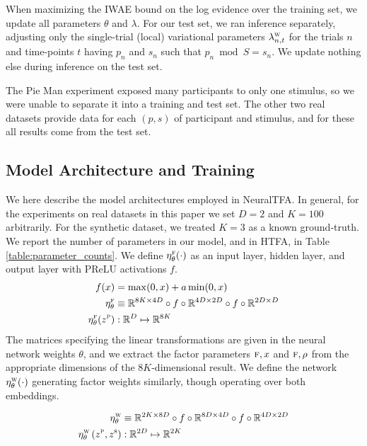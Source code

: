 \documentclass[twoside]{article}
\newcommand{\scf}{\textsc{f}}
\newcommand{\scw}{\textsc{w}}
\newcommand{\scp}{\textsc{p}}
\newcommand{\scs}{\textsc{s}}
\begin{document}
When maximizing the IWAE bound on the log evidence over the training set, we update all parameters $\theta$ and $\lambda$.  For our test set, we ran inference separately, adjusting only the single-trial (local) variational parameters $\lambda^\scw_{n,t}$ for the trials $n$ and time-points $t$ having $p_n$ and $s_n$ such that $p_n \bmod S = s_n$.  We update nothing else during inference on the test set.

The Pie Man experiment exposed many participants to only one stimulus, so we were unable to separate it into a training and test set.  The other two real datasets provide data for each $(p, s)$ of participant and stimulus, and for these all results come from the test set.
\vspace{-1em}
\subsection{Model Architecture and Training}
\label{subsec:model_architecture}
\vspace{-1em}
We here describe the model architectures employed in NeuralTFA.  In general, for the experiments on real datasets in this paper we set $D=2$ and $K=100$ arbitrarily.  For the synthetic dataset, we treated $K=3$ as a known ground-truth.  We report the number of parameters in our model, and in HTFA, in Table \ref{table:parameter_counts}.
We define $\eta^\scf_\theta(\cdot)$ as an input layer, hidden layer, and output layer with PReLU activations $f$.
\begin{align}
    f(x) &= \max (0, x) + a \min (0, x) \\
    \eta^\scf_\theta &\equiv \mathbb{R}^{8K \times 4D} \circ f \circ \mathbb{R}^{4D \times 2D} \circ f \circ \mathbb{R}^{2D \times D} \\
     \eta^\scf_\theta(z^\scp) &: \mathbb{R}^D \mapsto \mathbb{R}^{8K}
\end{align}
The matrices specifying the linear transformations are given in the neural network weights $\theta$, and we extract the factor parameters $\scf, x$ and $\scf, \rho$ from the appropriate dimensions of the $8K$-dimensional result.  We define the network $\eta^\scw_\theta(\cdot)$ generating factor weights similarly, though operating over both embeddings.

\begin{align}
    \eta^\scw_\theta &\equiv \mathbb{R}^{2K \times 8D} \circ f \circ \mathbb{R}^{8D \times 4D} \circ f \circ \mathbb{R}^{4D \times 2D} \\
        \eta^\scw_\theta \left( z^\scp, z^\scs \right) &: \mathbb{R}^{2D} \mapsto \mathbb{R}^{2K}
\end{align}
\end{document}
